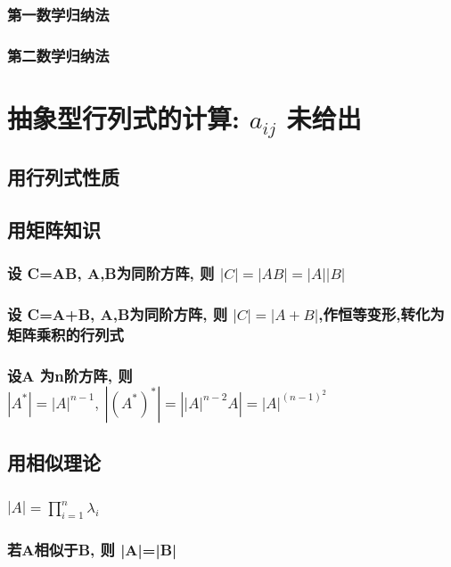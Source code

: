 \documentclass[UTF8]{ctexart}
\begin{document}
		\subsubsection{第一数学归纳法}
		
		\subsubsection{第二数学归纳法}
	
	
	\section{抽象型行列式的计算: $a_{ij}$ 未给出	}
	
		\subsection{用行列式性质}
		
		\subsection{用矩阵知识}
		
			\subsubsection{设 C=AB, A,B为同阶方阵, 则 $|C|=|AB|=|A||B|$}
			
			\subsubsection{设 C=A+B, A,B为同阶方阵, 则 $|C|=|A+B|$,作恒等变形,转化为矩阵乘积的行列式 }
			
			\subsubsection{设A 为n阶方阵, 则 $|A^*|=|A|^{n-1},\ |(A^*)^*|=\left| \left| A \right|^{n-2}A \right|=\left| A \right|^{\left( n-1 \right) ^2}	$}
		
		\subsection{用相似理论}
		
			\subsubsection{$\left| A \right|=\prod_{i=1}^n{\lambda _i}$}
			
			\subsubsection{若A相似于B, 则 |A|=|B|}
	
	
	
\end{document}
